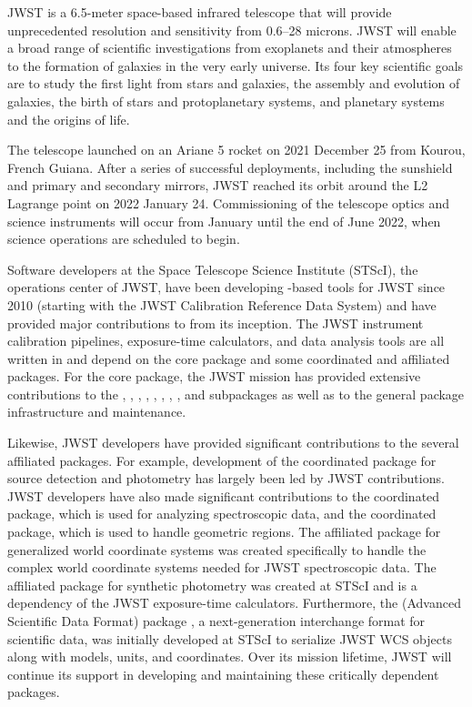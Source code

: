 \documentclass[modern]{aastex631}
\begin{document}
JWST is a 6.5-meter space-based
infrared telescope that will provide unprecedented resolution and
sensitivity from 0.6--28 microns. JWST will enable a broad range
of scientific investigations from exoplanets and their atmospheres
to the formation of galaxies in the very early universe. Its four
key scientific goals are to study the first light from stars and
galaxies, the assembly and evolution of galaxies, the birth of stars and
protoplanetary systems, and planetary systems and the origins of life.

The telescope launched on an Ariane 5 rocket on 2021 December 25 from
Kourou, French Guiana. After a series of successful deployments,
including the sunshield and primary and secondary mirrors, JWST reached
its orbit around the L2 Lagrange point on 2022 January 24. Commissioning
of the telescope optics and science instruments will occur from January
until the end of June 2022, when science operations are scheduled to
begin.

Software developers at the Space Telescope Science Institute (STScI),
the operations center of JWST, have been developing \python-based tools
for JWST since 2010 (starting with the JWST Calibration Reference Data
System) and have provided major contributions to \astropy from its
inception. The JWST instrument calibration pipelines, exposure-time
calculators, and data analysis tools are all written in \python and
depend on the \astropypkg core package and some coordinated and
affiliated packages. For the \astropypkg core package, the JWST mission
has provided extensive contributions to the ,
, , ,
, ,
, , and
 subpackages as well as to the general
package infrastructure and maintenance.

Likewise, JWST developers have provided significant contributions
to the several affiliated packages. For example, development of the
 coordinated package for source detection and
photometry has largely been led by JWST contributions. JWST developers
have also made significant contributions to the 
coordinated package, which is used for analyzing spectroscopic data,
and the  coordinated package, which is used to
handle geometric regions. The  affiliated package for
generalized world coordinate systems was created specifically to handle
the complex world coordinate systems needed for JWST spectroscopic
data. The  affiliated package for synthetic photometry
was created at STScI and is a dependency of the JWST exposure-time
calculators. Furthermore, the  (Advanced Scientific Data
Format) package \citep{ASDF}, a next-generation interchange format for
scientific data, was initially developed at STScI to serialize JWST WCS
objects along with \astropypkg models, units, and coordinates. Over
its mission lifetime, JWST will continue its support in developing and
maintaining these critically dependent packages.
\end{document}
